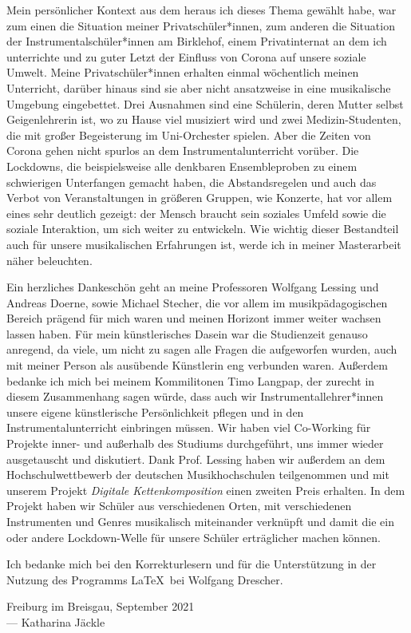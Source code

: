 
Mein persönlicher Kontext aus dem heraus ich dieses Thema gewählt habe, war zum
einen die Situation meiner Privatschüler*innen, zum anderen die Situation der
Instrumentalschüler*innen am Birklehof, einem Privatinternat an dem ich
unterrichte und zu guter Letzt der Einfluss von Corona auf unsere soziale
Umwelt. Meine Privatschüler*innen erhalten einmal wöchentlich meinen Unterricht,
darüber hinaus sind sie aber nicht ansatzweise in eine musikalische Umgebung
eingebettet. Drei Ausnahmen sind eine Schülerin, deren Mutter selbst
Geigenlehrerin ist, wo zu Hause viel musiziert wird und zwei Medizin-Studenten,
die mit großer Begeisterung im Uni-Orchester spielen. Aber die Zeiten von Corona
gehen nicht spurlos an dem Instrumentalunterricht vorüber. Die Lockdowns, die
beispielsweise alle denkbaren Ensembleproben zu einem schwierigen Unterfangen
gemacht haben, die Abstandsregelen und auch das Verbot von Veranstaltungen in
größeren Gruppen, wie Konzerte, hat vor allem eines sehr deutlich gezeigt: der
Mensch braucht sein soziales Umfeld sowie die soziale Interaktion, um sich
weiter zu entwickeln. Wie wichtig dieser Bestandteil auch für unsere
musikalischen Erfahrungen ist, werde ich in meiner Masterarbeit näher
beleuchten.

Ein herzliches Dankeschön geht an meine Professoren Wolfgang Lessing und Andreas
Doerne, sowie Michael Stecher, die vor allem im musikpädagogischen Bereich
prägend für mich waren und meinen Horizont immer weiter wachsen lassen haben.
Für mein künstlerisches Dasein war die Studienzeit genauso anregend, da viele,
um nicht zu sagen alle Fragen die aufgeworfen wurden, auch mit meiner Person als
ausübende Künstlerin eng verbunden waren. Außerdem bedanke ich mich bei meinem
Kommilitonen Timo Langpap, der zurecht in diesem Zusammenhang sagen würde, dass
auch wir Instrumentallehrer*innen unsere eigene künstlerische Persönlichkeit
pflegen und in den Instrumentalunterricht einbringen müssen. Wir haben viel
Co-Working für Projekte inner- und außerhalb des Studiums durchgeführt, uns
immer wieder ausgetauscht und diskutiert. Dank Prof. Lessing haben wir außerdem
an dem Hochschulwettbewerb der deutschen Musikhochschulen teilgenommen und mit
unserem Projekt \emph{Digitale Kettenkomposition} einen zweiten Preis erhalten.
In dem Projekt haben wir Schüler aus verschiedenen Orten, mit verschiedenen
Instrumenten und Genres musikalisch miteinander verknüpft und damit die ein oder
andere Lockdown-Welle für unsere Schüler erträglicher machen können. 

Ich bedanke mich bei den Korrekturlesern und für die Unterstützung in der
Nutzung des Programms \LaTeX\ bei Wolfgang Drescher.




\vspace{0.5cm}

\begin{flushright}
	{
		\small
		Freiburg im Breisgau, September 2021\\
		--- Katharina Jäckle }
\end{flushright}
